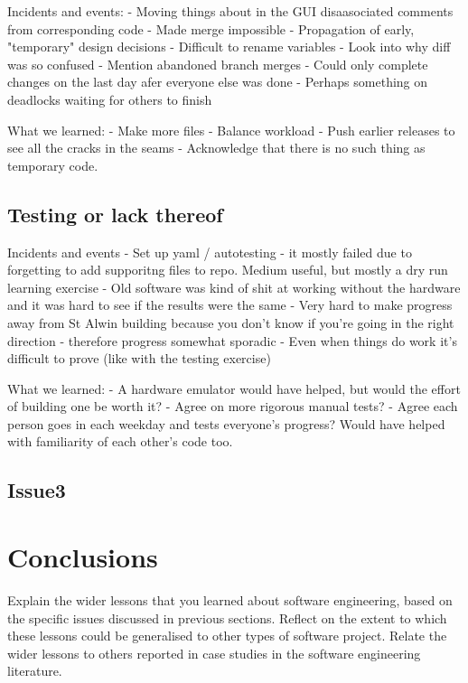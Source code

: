 \documentclass{l3proj}
\begin{document}
Incidents and events:
- Moving things about in the GUI disaasociated comments from corresponding code
- Made merge impossible
- Propagation of early, "temporary" design decisions
- Difficult to rename variables
- Look into why diff was so confused
- Mention abandoned branch merges
- Could only complete changes on the last day afer everyone else was done
- Perhaps something on deadlocks waiting for others to finish

What we learned:
- Make more files
- Balance workload
- Push earlier releases to see all the cracks in the seams
- Acknowledge that there is no such thing as temporary code.

\subsection{Testing or lack thereof}

Incidents and events
- Set up yaml / autotesting - it mostly failed due to forgetting to add supporitng files to repo. Medium useful, but mostly a dry run learning exercise
- Old software was kind of shit at working without the hardware and it was hard to see if the results were the same
- Very hard to make progress away from St Alwin building because you don't know if you're going in the right direction - therefore progress somewhat sporadic
- Even when things do work it's difficult to prove (like with the testing exercise)

What we learned:
- A hardware emulator would have helped, but would the effort of building one be worth it?
- Agree on more rigorous manual tests?
- Agree each person goes in each weekday and tests everyone's progress? Would have helped with familiarity of each other's code too.

\subsection{Issue3}


\section{Conclusions}
Explain the wider lessons that you learned about software engineering,
based on the specific issues discussed in previous sections.  Reflect
on the extent to which these lessons could be generalised to other
types of software project.  Relate the wider lessons to others
reported in case studies in the software engineering literature.



\end{document}
